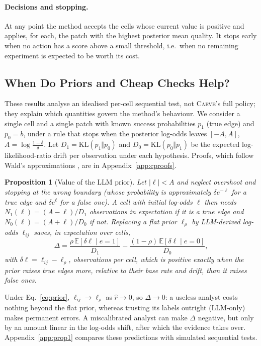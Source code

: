 \documentclass[11pt]{article}
\newtheorem{proposition}{Proposition}
\newcommand{\carve}{\textsc{Carve}}
\begin{document}
\paragraph{Decisions and stopping.} At any point the method accepts the cells whose current value is positive and applies, for each, the patch with the highest posterior mean quality. It stops early when no action has a score above a small threshold, i.e.\ when no remaining experiment is expected to be worth its cost.


\subsection{When Do Priors and Cheap Checks Help?}
\label{app:canalysis}

These results analyse an idealised per-cell sequential test, not \carve{}'s full policy; they explain which quantities govern the method's behaviour. We consider a single cell and a single patch with known success probabilities $p_1$ (true edge) and $p_0=b$, under a rule that stops when the posterior log-odds leaves $[-A,A]$, $A=\log\frac{1-\delta}{\delta}$. Let $D_1=\mathrm{KL}(p_1\Vert p_0)$ and $D_0=\mathrm{KL}(p_0\Vert p_1)$ be the expected log-likelihood-ratio drift per observation under each hypothesis. Proofs, which follow Wald's approximations \citep{wald1945sequential}, are in Appendix~\ref{app:cproofs}.

\begin{proposition}[Value of the LLM prior]
\label{prop:cprior}
Let $|\ell|<A$ and neglect overshoot and stopping at the wrong boundary (whose probability is approximately $\delta e^{-\ell}$ for a true edge and $\delta e^{\ell}$ for a false one). A cell with initial log-odds $\ell$ then needs $N_1(\ell)=(A-\ell)/D_1$ observations in expectation if it is a true edge and $N_0(\ell)=(A+\ell)/D_0$ if not. Replacing a flat prior $\ell_\rho$ by LLM-derived log-odds $\ell_{ij}$ saves, in expectation over cells,
\begin{equation}
\Delta = \frac{\rho\,\mathbb{E}[\delta\ell\mid e{=}1]}{D_1} - \frac{(1-\rho)\,\mathbb{E}[\delta\ell\mid e{=}0]}{D_0},
\end{equation}
with $\delta\ell=\ell_{ij}-\ell_\rho$,
observations per cell, which is positive exactly when the prior raises true edges more, relative to their base rate and drift, than it raises false ones.
\end{proposition}

Under Eq.~\ref{eq:prior}, $\ell_{ij}\to\ell_\rho$ as $\hat r\to0$, so $\Delta\to0$: a useless analyst costs nothing beyond the flat prior, whereas trusting its labels outright (LLM-only) makes permanent errors. A miscalibrated analyst can make $\Delta$ negative, but only by an amount linear in the log-odds shift, after which the evidence takes over. Appendix~\ref{app:prop1} compares these predictions with simulated sequential tests.
\end{document}
